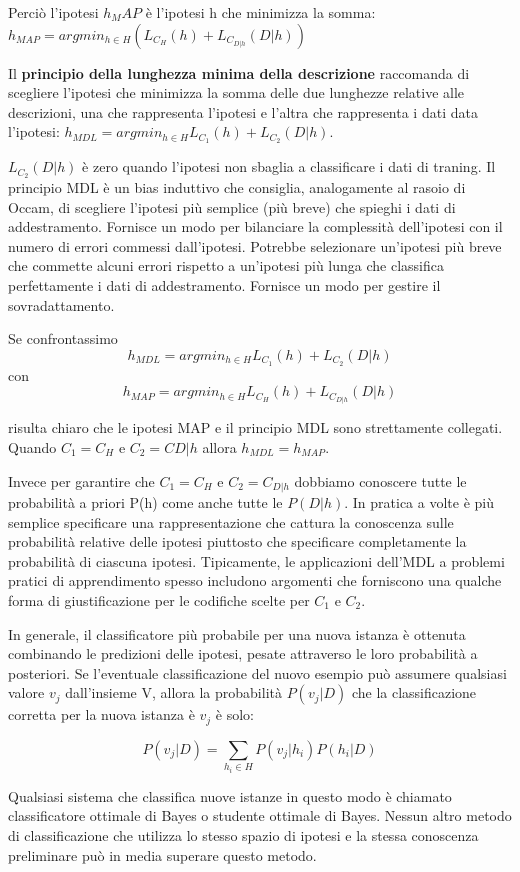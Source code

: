 \documentclass[a4paper]{extarticle}
\begin{document}
Perciò l'ipotesi $h_MAP$ è l'ipotesi h che minimizza la somma: $h_{MAP} = argmin_{h \in H} (L_{C_H}(h) + L_{C_{D|h}}(D|h))$

Il \textbf{principio della lunghezza minima della descrizione } raccomanda di scegliere l'ipotesi che minimizza la somma delle due lunghezze relative alle descrizioni, una che rappresenta l'ipotesi e l'altra che rappresenta i dati data l'ipotesi: $h_{MDL} = argmin_{h \in H} L_{C_1}(h) + L_{C_2} (D|h)$. 

$L_{C_2}(D|h)$ è zero quando l'ipotesi non sbaglia a classificare i dati di traning. Il principio MDL è un bias induttivo che consiglia, analogamente al rasoio di Occam, di scegliere l’ipotesi più semplice (più breve) che spieghi i dati di addestramento. Fornisce un modo per bilanciare la complessità dell'ipotesi con il numero di errori commessi dall'ipotesi. Potrebbe selezionare un'ipotesi più breve che commette alcuni errori rispetto a un'ipotesi più lunga che classifica perfettamente i dati di addestramento. Fornisce un modo per gestire il sovradattamento.

Se confrontassimo 
\begin{equation*}
h_{MDL} = argmin_{h\in H} L_{C_1} (h) + L_{C_2}(D|h)
\end{equation*}
con
\begin{equation*}
h_{MAP} = argmin_{h\in H} L_{C_H} (h) + L_{C_{D|h}}(D|h)
\end{equation*}

risulta chiaro che le ipotesi MAP e il principio MDL sono strettamente collegati. Quando $C_1 = C_H$ e $C_2=C{D|h}$ allora $h_{MDL} = h_{MAP}$.

Invece per garantire che $C_1=C_H$ e $C_2=C_{D|h}$ dobbiamo conoscere tutte le probabilità a priori P(h) come anche tutte le $P(D|h)$. In pratica a volte è più semplice specificare una rappresentazione che cattura la conoscenza sulle probabilità relative delle ipotesi piuttosto che specificare completamente la probabilità di ciascuna ipotesi. Tipicamente, le applicazioni dell’MDL a problemi pratici di apprendimento spesso includono argomenti che forniscono una qualche forma di giustificazione per le codifiche scelte per $C_1$ e $C_2$.

In generale, il classificatore più probabile per una nuova istanza è ottenuta combinando le predizioni delle ipotesi, pesate attraverso le loro probabilità a posteriori. Se l'eventuale classificazione del nuovo esempio può assumere qualsiasi valore $v_j$ dall'insieme V, allora la probabilità $P(v_j|D)$  che la classificazione corretta per la nuova istanza è $v_j$ è solo:

\begin{equation*}
P(v_j|D) = \sum\limits_{h_i \in H} P(v_j | h_i) P(h_i|D) 
\end{equation*}

Qualsiasi sistema che classifica nuove istanze in questo modo è chiamato classificatore ottimale di Bayes o studente ottimale di Bayes. Nessun altro metodo di classificazione che utilizza lo stesso spazio di ipotesi e la stessa conoscenza preliminare può in media superare questo metodo.
\end{document}
